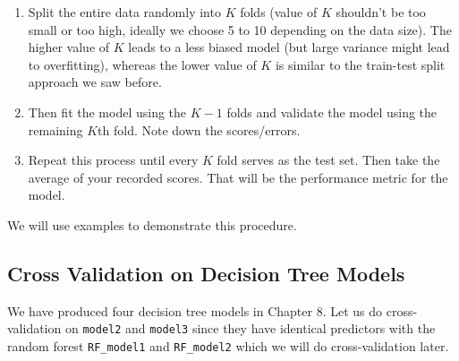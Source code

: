 \documentclass[
]{book}
\begin{document}
\begin{enumerate}
\def\labelenumi{\arabic{enumi}.}
\item
  Split the entire data randomly into \(K\) folds (value of \(K\) shouldn't be too small or too high, ideally we choose 5 to 10 depending on the data size). The higher value of \(K\) leads to a less biased model (but large variance might lead to overfitting), whereas the lower value of \(K\) is similar to the train-test split approach we saw before.
\item
  Then fit the model using the \(K - 1\) folds and validate the model using the remaining \(K\)th fold. Note down the scores/errors.
\item
  Repeat this process until every \(K\) fold serves as the test set. Then take the average of your recorded scores. That will be the performance metric for the model.
\end{enumerate}

We will use examples to demonstrate this procedure.

\hypertarget{cross-validation-on-decision-tree-models}{%
\subsection*{Cross Validation on Decision Tree Models}\label{cross-validation-on-decision-tree-models}}


We have produced four decision tree models in Chapter 8. Let us do cross-validation on \texttt{model2} and \texttt{model3} since they have identical predictors with the random forest \texttt{RF\_model1} and \texttt{RF\_model2} which we will do cross-validation later.
\end{document}
